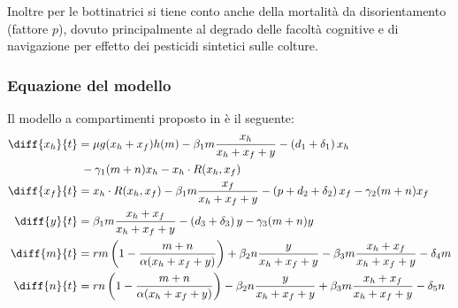 \begin{enumerate}
    Inoltre per le bottinatrici si tiene conto anche della mortalità da disorientamento (fattore $p$), dovuto principalmente al degrado delle facoltà cognitive e di navigazione per effetto dei pesticidi sintetici sulle colture.
\end{enumerate}


\subsubsection{Equazione del modello}
Il modello a compartimenti proposto in \cite{ratti2017} è il seguente:
\begin{align}
    \diff{x_h}{t} &= \mu g( x_h + x_f ) h(m) - \beta_1 m \frac{x_h}{x_h + x_f + y} - \left( d_1 + \delta_1 \right) x_h \notag \\ %
    \label{eq:r17xh}
        &{\;} - \gamma_1 (m+n) x_h - x_h \cdot R(x_h, x_f) \\ %
    \label{eq:r17xf}
    \diff{x_f}{t} &= x_h \cdot R(x_h, x_f) - \beta_1 m \frac{x_f}{x_h + x_f + y}
    - \left( p + d_2 + \delta_2 \right) x_f - \gamma_2 (m+n) x_f \\
    \label{eq:r17y}
    \diff{y}{t} &= \beta_1 m \frac{x_h + x_f}{x_h + x_f + y} - \left( d_3 + \delta_3 \right) y - \gamma_3 (m+n) y \\
    \label{eq:r17m}
    \diff{m}{t} &= rm \left( 1 - \frac{m+n}{ \alpha (x_h + x_f + y) } \right) + \beta_2 n \frac{y}{x_h + x_f + y}
    - \beta_3 m \frac{x_h + x_f}{x_h + x_f + y} - \delta_4 m \\
    \label{eq:r17n}
    \diff{n}{t} &= rn \left( 1 - \frac{m+n}{ \alpha (x_h + x_f + y) } \right) - \beta_2 n \frac{y}{x_h + x_f + y}
    + \beta_3 m \frac{x_h + x_f}{x_h + x_f + y} - \delta_5 n
\end{align}


